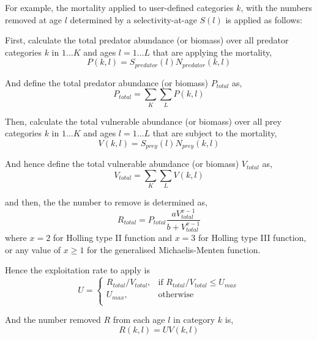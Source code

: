 For example, the mortality applied to user-defined categories $k$, with the numbers removed at age $l$ determined by a selectivity-at-age $S(l)$ is applied as follows:

First, calculate the total predator abundance (or biomass) over all predator categories $k$ in $1 \ldots K$ and ages $l = 1 \ldots L$ that are applying the mortality,
\begin{equation}
  P(k,l) = S_{predator}(l) N_{predator}(k,l)
\end{equation}

And define the total predator abundance (or biomass) $P_{total}$ as,
\begin{equation}
  P_{total}  = \sum\limits_K {\sum\limits_L {P(k,l)}} 
\end{equation}

Then, calculate the total vulnerable abundance (or biomass) over all prey categories $k$ in $1 \ldots K$ and ages $l = 1 \ldots L$ that are subject to the mortality,
\begin{equation}
  V(k,l) = S_{prey}(l) N_{prey}(k,l)
\end{equation}

And hence define the total vulnerable abundance (or biomass) $V_{total}$ as,
\begin{equation}
  V_{total}  = \sum\limits_K {\sum\limits_L {V(k,l)}} 
\end{equation}

and then, the the number to remove is determined as,
\begin{equation}
R_{total} = P_{total} \frac{a  V_{total}^{x-1}}{b + V_{total}^{x-1}}
\end{equation}
where $x=2$ for Holling type II function and $x=3$ for Holling type III function, or any value of $x \geq 1$ for the generalised Michaelis-Menten function.

Hence the exploitation rate to apply is 
\begin{equation}
U = \begin{cases}
  R_{total}/V_{total}, & \text{if $R_{total}/V_{total} \leq U_{max}$} \\
  U_{max}, & \text{otherwise}\\ 
  \end{cases} 
\end{equation}

And the number removed $R$ from each age $l$ in category $k$ is,
\begin{equation}
  R(k,l) = UV(k,l)
\end{equation}


